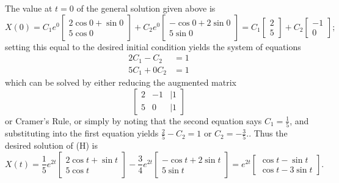 \documentclass[11pt]{amsart}
\begin{document}
The value at $t=0$ of the general solution given above is
\begin{equation*}
		X(0)=C_{1}e^{0}\begin{bmatrix}
			2\cos 0+\sin 0\\
			5\cos 0
		\end{bmatrix}
	+C_{2 } e^{0}\begin{bmatrix}
			-\cos 0+2\sin 0\\
			5\sin 0
		\end{bmatrix}
		=C_{1}\begin{bmatrix}
			2\\
			5
		\end{bmatrix}
		+C_{2}\begin{bmatrix}
			-1\\
			0
		\end{bmatrix};
\end{equation*}
setting this equal to the desired initial condition yields the system of equations
\begin {align*}
	2C_{1}-C_{2}&=1\\
	5C_{1}+0C_{2}&=1
\end{align*}
which can be solved by either reducing the augmented matrix
\begin{equation*}
	\begin{bmatrix}
		2&-1&|1\\
		5&0&|1
	\end{bmatrix}
\end{equation*}
or Cramer's Rule, or simply by noting that the second equation says
	$C_{1}=\frac{1}{5}$, 
	and substituting into the first equation yields
	$\frac{2}{5}-C_{2}=1$
	or
	$C_{2}=-\frac{3}{5}$..
Thus the desired solution of (H) is
\begin{equation*}
	X(t)=
	\frac{1}{5}e^{2t}\begin{bmatrix}2\cos t+\sin t\\5\cos t\end{bmatrix}
	-\frac{3}{4}e^{2t}\begin{bmatrix}-\cos t+2\sin t\\5\sin t\end{bmatrix}
	=e^{2t}\begin{bmatrix}\cos t-\sin t\\\cos t-3\sin t\end{bmatrix}.
\end{equation*}
\end{document}
